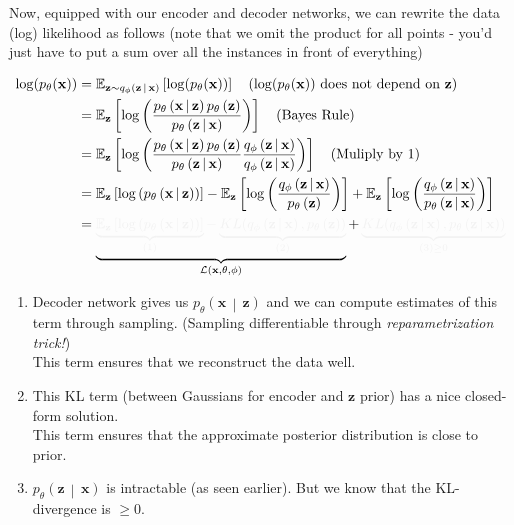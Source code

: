 \documentclass[a2paper,8pt]{extarticle}
\makeatletter
\def\mc#1#{\@mc{#1}}
\def\@mc#1#2#3{%
  \protect\leavevmode
  \begingroup
    \color#1{#2}#3%
  \endgroup
}
\newcommand{\mcr}[1]{\mc{lighttext}{#1}}
\newcommand{\mcg}[1]{\mc{lighttext}{#1}}
\newcommand{\mcr}[1]{\mc{red}{#1}}
\newcommand{\mcg}[1]{\mc{green}{#1}}
\newcommand{\cL}{\mathcal{L}}
\newcommand{\Dist}[2]{#1\left( #2 \right)}
\newcommand{\cDist}[3]{#1\left( #2 \,\middle|\, #3 \right)}
\newcommand{\Exp}[2][]{{\mathbb{E}_{#1}}\left[ #2
\right]}
\renewcommand{\vec}[1]{\mathbf{#1}}
\newcommand{\vx}{\vec{x}}
\newcommand{\vz}{\vec{z}}
\makeatother
\begin{document}
\begin{landscape}
\begin{multicols*}{7}
Now, equipped with our encoder and decoder networks, we can rewrite the data
(log) likelihood as follows (note that we omit the product for all points -
you'd just have to put a sum over all the instances in front of everything)

\begin{gather*}
\begin{align*}
\log(p_\theta(\vx))
&=\Exp[\vz\sim \cDist{q_\phi}{\vz}{\vx}]{\log(p_\theta(\vx))}
\quad (\log(p_\theta(\vx))\text{ does not depend on $\vz$})
\\
&=
\Exp[\vz]{
\log\left(
\frac{
\cDist{p_\theta}{\vx}{\vz}\Dist{p_\theta}{\vz}
}{
\cDist{p_\theta}{\vz}{\vx}
}
\right)
}
\quad(\text{Bayes Rule})
\\
&=
\Exp[\vz]{
\log\left(
\frac{
\cDist{p_\theta}{\vx}{\vz}\Dist{p_\theta}{\vz}
}{
\cDist{p_\theta}{\vz}{\vx}
}
\frac{\cDist{q_\phi}{\vz}{\vx}}{\cDist{q_\phi}{\vz}{\vx}}
\right)
}
\quad(\text{Muliply by 1})
\\
&=
\Exp[\vz]{\log\left(\cDist{p_\theta}{\vx}{\vz}\right)}
-
\Exp[\vz]{\log\left(
\frac{
\cDist{q_\phi}{\vz}{\vx}
}{
\Dist{p_\theta}{\vz}
}
\right)}
+
\Exp[\vz]{\log\left(
\frac{
\cDist{q_\phi}{\vz}{\vx}
}{
\cDist{p_\theta}{\vz}{\vx}
}
\right)}
\\
&=
\underbrace{
\mcg{\underbrace{\Exp[\vz]{\log\left(\cDist{p_\theta}{\vx}{\vz}\right)}}_{(1)}
-
\underbrace{KL(\cDist{q_\phi}{\vz}{\vx},\Dist{p_\theta}{\vz})}_{(2)}}
}_{\cL(\vx,\theta,\phi)}
+
\mcr{
\underbrace{KL(\cDist{q_\phi}{\vz}{\vx},\cDist{p_\theta}{\vz}{\vx})}_{(3)\geq 0}
}
\end{align*}
\end{gather*}

\begin{enumerate}[label=(\arabic*)]
  \item Decoder network gives us $\cDist{p_\theta}{\vx}{\vz}$ and we can compute
  estimates of this term through sampling. (Sampling differentiable through
  \emph{reparametrization trick!})\\
  This term ensures that we reconstruct the data well.
  \item This KL term (between Gaussians for encoder and $\vz$ prior) has a nice
  closed-form solution.\\

  This term ensures that the approximate posterior distribution is close to
  prior.
  \item $\cDist{p_\theta}{\vz}{\vx}$ is intractable (as seen earlier). But we
  know that the KL-divergence is $\geq 0$.
\end{enumerate}


\end{multicols*}
\end{landscape}
\end{document}
